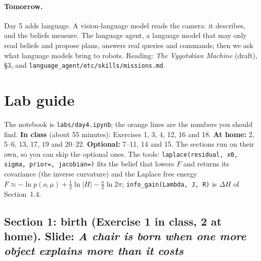 \documentclass[11pt]{article}
\begin{document}
\paragraph{Tomorrow.} Day 5 adds language. A vision-language model reads the camera: it describes, and the beliefs measure. The language agent, a language model that may only read beliefs and propose plans, answers real queries and commands; then we ask what language models bring to robots. Reading: \emph{The Vygotskian Machine} (draft), \S3, and \texttt{language\_agent/etc/skills/missions.md}.

\section{Lab guide}

The notebook is \texttt{labs/day4.ipynb}; the orange lines are the numbers you should find. \textbf{In class} (about 55 minutes): Exercises 1, 3, 4, 12, 16 and 18. \textbf{At home:} 2, 5--6, 13, 17, 19 and 20--22. \textbf{Optional:} 7--11, 14 and 15. The sections run on their own, so you can skip the optional ones. The tools: \texttt{laplace(residual, x0, sigma, prior=, jacobian=)} fits the belief that lowers $F$ and returns its covariance (the inverse curvature) and the Laplace free energy $F\approx-\ln p(o,\mu)+\tfrac12\ln|H|-\tfrac n2\ln2\pi$; \texttt{info\_gain(Lambda, J, R)} is $\Delta H$ of Section~1.4.

\subsection*{Section 1: birth (Exercise 1 in class, 2 at home). Slide: \emph{A chair is born when one more object explains more than it costs}}
\end{document}

